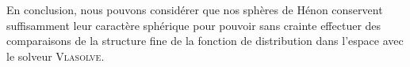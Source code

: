 		En conclusion, nous pouvons considérer que nos sphères de Hénon conservent suffisamment leur caractère sphérique pour pouvoir sans crainte effectuer
		des comparaisons de la structure fine de la fonction de distribution dans l'espace avec le solveur \textsc{Vlasolve}.





